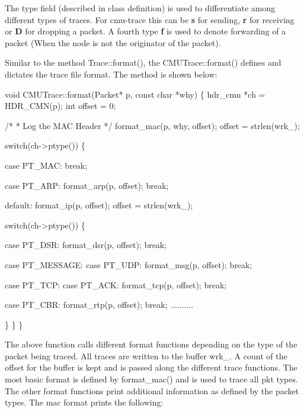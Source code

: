 The type field (described in  class definition) is used to differentiate among different types of traces. For cmu-trace this can be {\bf s} for sending, {\bf r} for receiving or {\bf D} for dropping a packet. A fourth type {\bf f} is used to denote forwarding of a packet (When the node is not the originator of the packet).

Similar to the method Trace::format(), the CMUTrace::format() defines and dictates the trace file format. The method is shown below:

\begin{program}
void CMUTrace::format(Packet* p, const char *why)
\{
	hdr_cmn *ch = HDR_CMN(p);
	int offset = 0;

	/*
	 * Log the MAC Header
	 */
	format_mac(p, why, offset);
	offset = strlen(wrk_);

	switch(ch->ptype()) \{

	case PT_MAC:
		break;

	case PT_ARP:
		format_arp(p, offset);
		break;

	default:
		format_ip(p, offset);
		offset = strlen(wrk_);

		switch(ch->ptype()) \{

		case PT_DSR:
			format_dsr(p, offset);
			break;

		case PT_MESSAGE:
		case PT_UDP:
			format_msg(p, offset);
			break;
			
		case PT_TCP:
		case PT_ACK:
			format_tcp(p, offset);
			break;
			
		case PT_CBR:
			format_rtp(p, offset);
			break;
		..........

		\}
	\}
\}
\end{program}
The above function calls different format functions depending on the type of the packet being traced. All traces are written to the buffer wrk\_. A count of the offset for the buffer is kept and is passed along the different trace functions. The most basic format is defined by format\_mac() and is used to trace all pkt types. The other format functions print additional information as defined by the packet types. The mac format prints the following:

